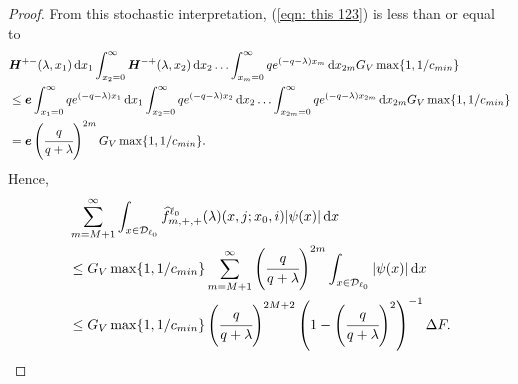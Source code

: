 \begin{proof}
        From this stochastic interpretation, (\ref{eqn: this 123}) is less than or equal to 
        \begin{align}
		&\boldsymbol H^{+-}(\lambda,x_1) \, \mathrm{d} x_1 \int_{x_2=0}^\infty \boldsymbol H^{-+}(\lambda,x_2)  \, \mathrm{d} x_2  
                	\hdots \int_{x_m=0}^\infty qe^{(-q-\lambda)x_m}\, \mathrm{d} x_{2m}G_V\max\{1, 1/c_{min}\} \nonumber
		\\&\leq \boldsymbol e\int_{x_1=0}^\infty qe^{(-q-\lambda)x_1}  \, \mathrm{d} x_1 \int_{x_2=0}^\infty qe^{(-q-\lambda)x_2}  \, \mathrm{d} x_2  
                	\hdots \int_{x_{2m}=0}^\infty qe^{(-q-\lambda)x_{2m}}\, \mathrm{d} x_{2m}G_V\max\{1, 1/c_{min}\} \nonumber
		\\&= \boldsymbol e\left(\cfrac{q}{q+\lambda}\right)^{2m}G_V\max\{1, 1/c_{min}\}.\label{eqn: bound ggggaaaa}
        \end{align}
        Hence,  
        \begin{align}
	         &\sum_{m=M+1}^\infty \int_{x\in\mathcal{D}_{\ell_0}} \widehat f^{\ell_0}_{m,+,+}(\lambda)(x,j;x_0,i)|\psi(x)|\, \mathrm{d} x \nonumber
	        \\&\leq  {G_V}\max\{1, 1/c_{min}\}  \sum_{m=M+1}^\infty \left(\cfrac{q}{q+\lambda}\right)^{2m}\int_{x\in\mathcal{D}_{\ell_0}} |\psi(x)|\, \mathrm{d} x \nonumber
	        \\&\leq {G_V}\max\{1, 1/c_{min}\} \left(\cfrac{q}{q+\lambda}\right)^{2M+2} \left(1-\left(\cfrac{q}{q+\lambda}\right)^2\right)^{-1} \Delta F.
        \end{align}
        

\end{proof}
